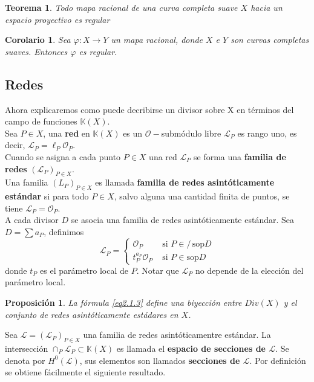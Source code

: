\documentclass[12pt,a4paper]{report}
\newcommand{\noin}{\in \!\!\!\!\! / }
\newcommand{\Ou}{\mathscr{O}}
\newcommand{\sop}{\mbox{sop}}
\newcommand{\K}{\mathbb{K}}
\newcommand{\Li}{\mathscr{L}}
\newtheorem{teo}{Teorema}[chapter]
\newtheorem{cor}{Corolario}[chapter]
\newtheorem{prop}{Proposición}[chapter]
\begin{document}
\begin{teo}\label{2.1.59}
	Todo mapa racional de una curva completa suave $X$ hacia un espacio proyectivo es regular
\end{teo}

\begin{cor}
	Sea $\varphi: X \rightarrow Y$ un mapa racional, donde $X$ e $Y$ son curvas completas suaves. Entonces $\varphi $ es regular.
\end{cor}


\subsection{Redes}
Ahora explicaremos como puede decribirse un divisor sobre X en términos del campo de funciones $\K (X)$.\\

Sea $P \in X$, una \textbf{red} en $\K(X)$ es un $\Ou-$submódulo libre $\Li_{P}$ es rango uno, es decir, $\Li_{P} = \ell_{P} \Ou_{P} $. \\
Cuando se asigna a cada punto $P \in X$ una red $\Li_{P}$ se forma una \textbf{familia de redes} $(\Li_{P})_{P \in X}$. \\
Una familia $(L_{P})_{P \in X}$ es llamada \textbf{familia de redes asintóticamente estándar} si para todo $P \in X$, salvo alguna una cantidad finita de puntos, se tiene $\Li_{P} = \Ou _{P}$.\\

A cada divisor $D$ se asocia una familia de redes asintóticamente estándar. Sea $D= \sum a_{P} $, definimos \begin{equation} \label{eq2.1.3}
\Li _{P} = \left\lbrace \begin{array}{ll}
\Ou_{P} & \mbox{ si } P \noin \, \sop D \\
t_{P}^{a_{P}} \Ou_{P} & \mbox{ si } P \in \sop D
\end{array} \right.
\end{equation}    
donde $t_{P}$ es el parámetro local de $P$. Notar que $ \Li_{P}$ no depende de la elección del parámetro local. 

\begin{prop}
	La fórmula \ref{eq2.1.3} define una biyección entre $Div(X)$ y el conjunto de redes asintóticamente estádares en $X$.
\end{prop} 

Sea $\Li = (\Li_{P})_{P \in X}$ una familia de redes asintóticamentre estándar. La intersección $\cap _{P} \Li_{P} \subset \K(X)$ es llamada el \textbf{espacio de secciones de $\Li$}. Se denota por $H^{0}(\Li)$, sus elementos son llamados \textbf{secciones de $\Li$}. Por definición se obtiene fácilmente el siguiente resultado.
\end{document}
